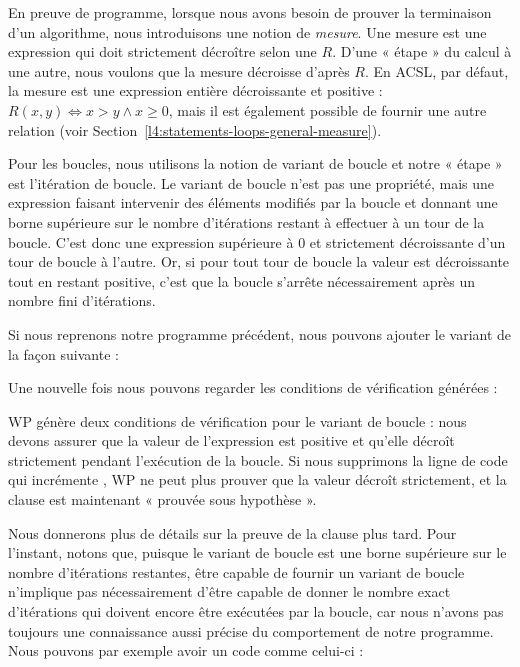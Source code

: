 \label{l4:statements-loops-variant-measure}


En preuve de programme, lorsque nous avons besoin de prouver la terminaison d'un
algorithme, nous introduisons une notion de \textit{mesure}. Une mesure est une
expression qui doit strictement décroître selon une
$R$. D'une « étape » du calcul à une autre, nous voulons que la mesure décroisse
d'après $R$. En ACSL, par défaut, la mesure est une expression entière
décroissante et positive : $R(x,y) \Leftrightarrow x > y \wedge x \geq 0$, mais
il est également possible de fournir une autre relation (voir
Section~\ref{l4:statements-loops-general-measure}).


Pour les boucles, nous utilisons la notion de variant de boucle et notre
« étape » est l'itération de boucle. Le variant de boucle n'est pas une
propriété, mais une expression faisant intervenir des éléments
modifiés par la boucle et donnant une borne supérieure sur le nombre
d'itérations restant à effectuer à un tour de la boucle. C'est donc une
expression supérieure à 0 et strictement décroissante d'un tour de boucle à
l'autre. Or, si pour tout tour de boucle la valeur est décroissante tout en
restant positive, c'est que la boucle s'arrête nécessairement après un nombre fini
d'itérations.


Si nous reprenons notre programme précédent, nous pouvons ajouter le variant
de la façon suivante :




Une nouvelle fois nous pouvons regarder les conditions de vérification générées :




WP génère deux conditions de vérification pour le variant de boucle : nous devons
assurer que la valeur de l'expression est positive et qu'elle décroît
strictement pendant l'exécution de la boucle. Si nous supprimons la ligne de
code qui incrémente , WP ne peut plus prouver que la valeur
 décroît strictement, et la clause 
est maintenant « prouvée sous hypothèse ».




Nous donnerons plus de détails sur la preuve de la clause 
plus tard. Pour l'instant, notons que, puisque le variant de boucle est une
borne supérieure sur le nombre d'itérations restantes, être capable de fournir un
variant de boucle n'implique pas nécessairement d'être capable de donner le nombre
exact d'itérations qui doivent encore être exécutées par la boucle, car nous
n'avons pas toujours une connaissance aussi précise du comportement de notre
programme. Nous pouvons par exemple avoir un code comme celui-ci :


